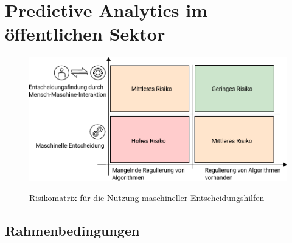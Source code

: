 \chapter{Predictive Analytics im öffentlichen Sektor}

\begin{figure}%
\centering
\caption{Risikomatrix für die Nutzung maschineller Entscheidungshilfen}
\includegraphics[scale=1.0]{Grafiken/Risk_Matrix_Ink.pdf} 
\label{pic:Risiko_Matrix}
\end{figure}

\section{Rahmenbedingungen}



